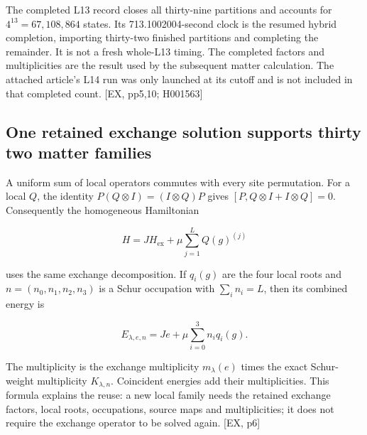 The completed L13 record closes all thirty-nine partitions and accounts for \(4^{13}=67{,}108{,}864\) states. Its 713.1002004-second clock is the resumed hybrid completion, importing thirty-two finished partitions and completing the remainder. It is not a fresh whole-L13 timing. The completed factors and multiplicities are the result used by the subsequent matter calculation. The attached article's L14 run was only launched at its cutoff and is not included in that completed count. {[}EX, pp5,10; H001563{]}

\subsection{One retained exchange solution supports thirty two matter families}\label{one-retained-exchange-solution-supports-thirty-two-matter-families}

A uniform sum of local operators commutes with every site permutation. For a local \(Q\), the identity \(P(Q\otimes I)=(I\otimes Q)P\) gives \([P,Q\otimes I+I\otimes Q]=0\). Consequently the homogeneous Hamiltonian

\[
H=JH_{\mathrm{ex}}+\mu\sum_{j=1}^{L}Q(g)^{(j)}
\]

uses the same exchange decomposition. If \(q_i(g)\) are the four local roots and \(n=(n_0,n_1,n_2,n_3)\) is a Schur occupation with \(\sum_i n_i=L\), then its combined energy is

\[
E_{\lambda,e,n}=Je+\mu\sum_{i=0}^{3}n_iq_i(g).
\]

The multiplicity is the exchange multiplicity \(m_\lambda(e)\) times the exact Schur-weight multiplicity \(K_{\lambda,n}\). Coincident energies add their multiplicities. This formula explains the reuse: a new local family needs the retained exchange factors, local roots, occupations, source maps and multiplicities; it does not require the exchange operator to be solved again. {[}EX, p6{]}

